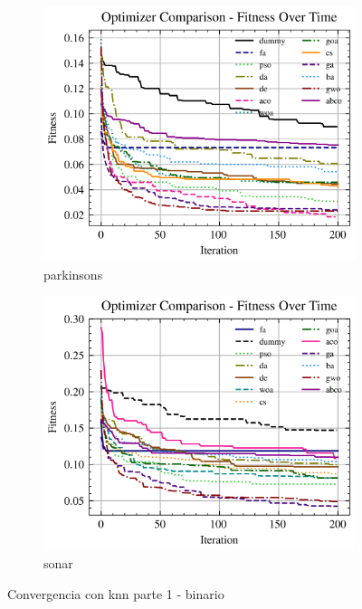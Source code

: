 \begin{figure}[htp]
    \begin{subfigure}[htp]{0.45\textwidth}
        \includegraphics[width=\textwidth]{imagenes/fitness_charts/img/binary/parkinsons/optimizers_fitness_knn.png}
        \caption{parkinsons}
    \end{subfigure}
    \begin{subfigure}[htp]{0.45\textwidth}
        \includegraphics[width=\textwidth]{imagenes/fitness_charts/img/binary/sonar/optimizers_fitness_knn.png}
        \caption{sonar}
    \end{subfigure}
    \caption{Convergencia con knn parte 1 - binario}
    \label{fig:convergencia_knn_1_bin}
\end{figure}

